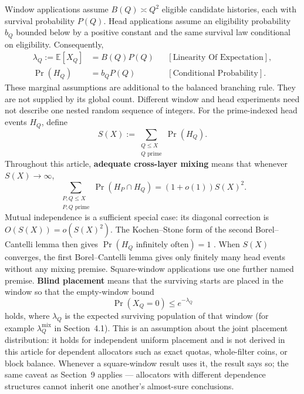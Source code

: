 Window applications assume $B(Q)\asymp Q^2$ eligible candidate histories, each with survival probability $P(Q)$. Head applications assume an eligibility probability $b_Q$ bounded below by a positive constant and the same survival law conditional on eligibility. Consequently,
\begin{equation*}
\begin{aligned}
\lambda_Q:=\mathbb E[X_Q]&=B(Q)P(Q)
&&[\text{Linearity Of Expectation}],\\
\Pr(H_Q)&=b_QP(Q)
&&[\text{Conditional Probability}].
\end{aligned}
\end{equation*}
These marginal assumptions are additional to the balanced branching rule. They are not supplied by its global count. Different window and head experiments need not describe one nested random sequence of integers.
For the prime-indexed head events $H_Q$, define
\begin{equation*}
S(X):=
\sum_{\substack{Q\le X\\Q\text{ prime}}}\Pr(H_Q).
\end{equation*}
Throughout this article, \textbf{adequate cross-layer mixing} means that whenever $S(X)\longrightarrow\infty$,
\begin{equation*}
\sum_{\substack{P,Q\le X\\P,Q\text{ prime}}}
\Pr(H_P\cap H_Q)
=
(1+o(1))S(X)^2.
\end{equation*}
Mutual independence is a sufficient special case: its diagonal correction is $O(S(X))=o(S(X)^2)$. The Kochen--Stone form of the second Borel--Cantelli lemma then gives $\Pr(H_Q\text{ infinitely often})=1$ \cite{kochenstone1964}. When $S(X)$ converges, the first Borel--Cantelli lemma gives only finitely many head events without any mixing premise.
Square-window applications use one further named premise. \textbf{Blind placement} means that the surviving starts are placed in the window so that the empty-window bound
\begin{equation*}
\Pr(X_Q=0)\le e^{-\lambda_Q}
\end{equation*}
holds, where $\lambda_Q$ is the expected surviving population of that window (for example $\lambda_Q^{\mathrm{mix}}$ in Section~4.1). This is an assumption about the joint placement distribution: it holds for independent uniform placement and is not derived in this article for dependent allocators such as exact quotas, whole-filter coins, or block balance. Whenever a square-window result uses it, the result says so; the same caveat as Section~9 applies — allocators with different dependence structures cannot inherit one another's almost-sure conclusions.
